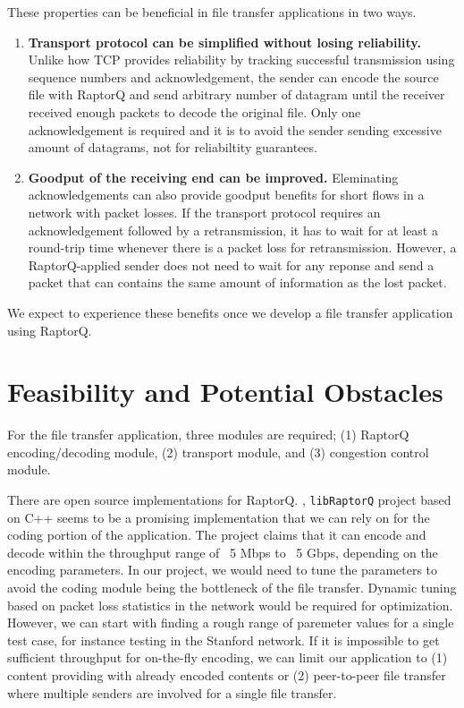 \documentclass{sig-alternate-10pt}
\begin{document}
These properties can be beneficial in file transfer applications in two ways.
\begin{enumerate}[label=(\alph*)]
  \item \textbf{Transport protocol can be simplified without losing
  reliability.}
  Unlike how TCP provides reliability by tracking successful transmission using
  sequence numbers and acknowledgement, the sender can encode the source file
  with RaptorQ and send arbitrary number of datagram until the receiver received
  enough packets to decode the original file. Only one acknowledgement is
  required and it is to avoid the sender sending excessive amount of datagrams,
  not for reliabiltity guarantees.
  \item \textbf{Goodput of the receiving end can be improved.}
  Eleminating acknowledgements can also provide goodput benefits for short flows
  in a network with packet losses. If the transport protocol requires an
  acknowledgement followed by a retransmission, it has to wait for at least a
  round-trip time whenever there is a packet loss for retransmission. However,
  a RaptorQ-applied sender does not need to wait for any reponse and send a
  packet that can contains the same amount of information as the lost packet.
\end{enumerate}

We expect to experience these benefits once we develop a file transfer
application using RaptorQ.

\section{Feasibility and Potential Obstacles}
For the file transfer application, three modules are required; (1) RaptorQ
encoding/decoding module, (2) transport module, and (3) congestion control
module. 

There are open source implementations for RaptorQ. \cite{openrq},
\cite{libraptorq} \texttt{libRaptorQ} project \cite{libraptorq} based on C++
seems to be a promising implementation that we can rely on for the coding
portion of the application. The project claims that it can encode and decode
within the throughput range of ~5 Mbps to ~5 Gbps, depending on the encoding
parameters. In our project, we would need to tune the parameters to avoid the
coding module being the bottleneck of the file transfer.  Dynamic tuning based
on packet loss statistics in the network would be required for optimization.
However, we can start with finding a rough range of paremeter values for a
single test case, for instance testing in the Stanford network. If it is
impossible to get sufficient throughput for on-the-fly encoding, we can limit
our application to (1) content providing with already encoded contents or (2)
peer-to-peer file transfer where multiple senders are involved for a single file
transfer.
\end{document}
